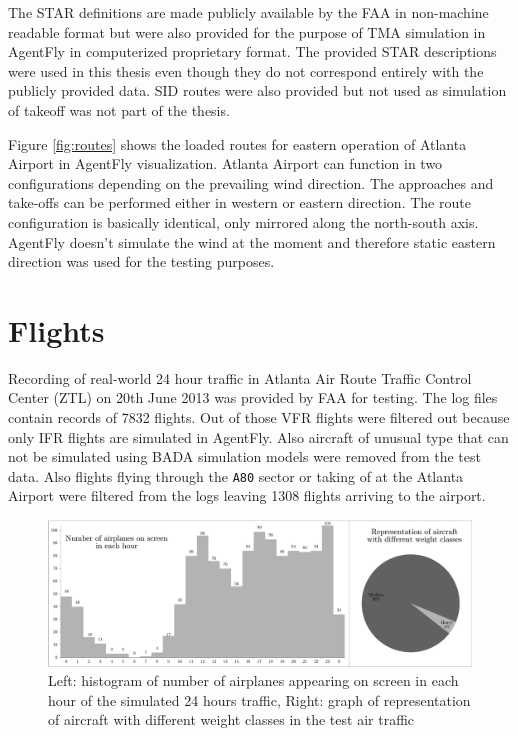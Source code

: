 The STAR definitions are made publicly available by the FAA in non-machine readable format but were also provided for the purpose of TMA simulation in AgentFly in computerized proprietary format. The provided STAR descriptions were used in this thesis even though they do not correspond entirely with the publicly provided data. SID routes were also provided but not used as simulation of takeoff was not part of the thesis.

Figure \ref{fig:routes} shows the loaded routes for eastern operation of Atlanta Airport in AgentFly visualization. Atlanta Airport can function in two configurations depending on the prevailing wind direction. The approaches and take-offs can be performed either in western or eastern direction. The route configuration is basically identical, only mirrored along the north-south axis. AgentFly doesn't simulate the wind at the moment and therefore static eastern direction was used for the testing purposes.

\section{Flights}

Recording of real-world 24 hour traffic in Atlanta Air Route Traffic Control Center (ZTL) on 20th June 2013 was provided by FAA for testing. The log files contain records of 7832 flights. Out of those VFR flights were filtered out because only IFR flights are simulated in AgentFly. Also aircraft of unusual type that can not be simulated using BADA simulation models were removed from the test data. Also flights flying through the \texttt{A80} sector or taking of at the Atlanta Airport were filtered from the logs leaving 1308 flights arriving to the airport.

\begin{figure}[h]
    \centering
    \includegraphics[width=\textwidth]{graphs/real-flights.pdf}
    \caption{Left: histogram of number of airplanes appearing on screen in each hour of the simulated 24 hours traffic, Right: graph of representation of aircraft with different weight classes in the test air traffic}
    \label{graph:flights}
\end{figure}

